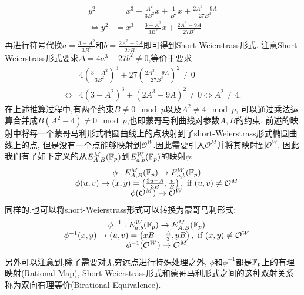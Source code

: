 \begin{equation*}
\begin{split}
y^2 & = x^3 - \frac{A^2}{3B^2}x + \frac{1}{B^2}x + \frac{2A^3 - 9A}{27B^3} \\
\iff 
y^2 & = x^3 + \frac{3-A^2}{3B^2} x + \frac{2A^3 - 9A}{27B^3} \\
\end{split}
\end{equation*}
再进行符号代换$a = \frac{3-A^2}{3B^2}$和$b = \frac{2A^3 - 9A}{27B^3}$即可得到Short Weierstrass形式.
注意Short Weierstrass形式要求$\Delta = 4a^3 + 27b^2 \neq 0$,等价于要求
\begin{equation*}
\begin{split}
& 4\left(\frac{3-A^2}{3B^2}\right)^3  + 27\left(  \frac{2A^3 - 9A}{27B^3} \right)^2  \neq 0 \\
\iff 
& 4\left(3-A^2\right)^3 + \left(  2A^3 - 9A \right)^2 \neq 0 \iff  A^2 \neq 4.
\end{split}
\end{equation*}
在上述推算过程中,有两个约束$B\neq 0\mod p$以及$A^2\neq 4\mod p$,
可以通过乘法运算合并成$B(A^2-4)\neq 0  \mod p$,也即蒙哥马利曲线对参数$A,B$的约束.
前述的映射中将每一个蒙哥马利形式椭圆曲线上的点映射到了short-Weierstrass形式椭圆曲线上的点,
但是没有一个点能够映射到$\mathcal{O}^W$.因此需要引入$\mathcal{O}^M$并将其映射到$\mathcal{O}^W$.
因此我们有了如下定义的从$E_{A,B}^M(\mathbb{F}_p)$到$E_{a,b}^{W}(\mathbb{F}_p)$的映射$\phi$:
\begin{equation*}
\begin{array}{cc}
& \phi: E_{A,B}^M(\mathbb{F}_p)   \rightarrow E_{a,b}^{W}(\mathbb{F}_p) \\
& \phi(u,v)   \rightarrow  (x,y) = \left( \frac{3u+A}{3B}, \frac{v}{B} \right),\ \text{if}\  (u,v)\neq \mathcal{O}^M \\
& \phi(\mathcal{O}^M) \rightarrow \mathcal{O}^W
\end{array}
\end{equation*}
同样的,也可以将short-Weierstrass形式可以转换为蒙哥马利形式:
\begin{equation*}
\begin{array}{cc}
&\phi^{-1}: E_{a,b}^{W}(\mathbb{F}_p)   \rightarrow  E_{A,B}^M(\mathbb{F}_p)\\
&\phi^{-1}(x, y)   \rightarrow (u,v) = \left(xB - \frac{A}{3}, yB\right),\ \text{if}\  (x, y)\neq \mathcal{O}^W \\
&\phi^{-1}(\mathcal{O}^W) \rightarrow \mathcal{O}^M
\end{array}
\end{equation*}
另外可以注意到,除了需要对无穷远点进行特殊处理之外, $\phi$和$\phi^{-1}$都是$\mathbb{F}_p$上的有理映射(Rational Map),
Short-Weierstrass形式和蒙哥马利形式之间的这种双射关系称为双向有理等价(Birational Equivalence).


